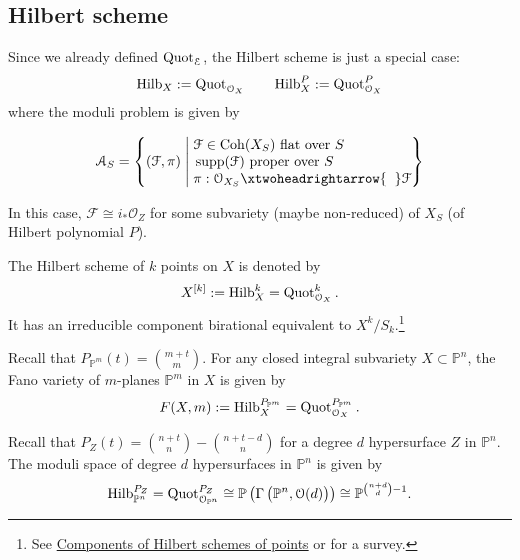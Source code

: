 \subsection{Hilbert scheme}
Since we already defined $\operatorname{Quot}_{\mathcal{E}}$, the Hilbert scheme is just a special case:
$$\operatorname{Hilb}_X:= \operatorname{Quot}_{\mathcal{O}_X} \qquad \operatorname{Hilb}_X^P:= \operatorname{Quot}_{\mathcal{O}_X}^P$$
where the moduli problem is given by

$$\mathcal{A}_S=\left\{(\mathcal{F},\pi)  \;\middle|\; \begin{aligned}
&\\[-5mm]
&\mathcal{F} \in \Coh(X_S) \text{ flat over $S$ }\\[-1mm]
&\supp(\mathcal{F})  \text{ proper over $S$ }\\[-1mm]
& \pi:\mathcal{O}_{X_S} \xtwoheadrightarrow{\hspace{2mm}}  \mathcal{F}
\end{aligned}
 \right\}$$
 
 In this case, $\mathcal{F} \cong i_* \mathcal{O}_Z$ for some subvariety (maybe non-reduced) of $X_S$ (of Hilbert polynomial $P$).
 
\begin{eg}
The Hilbert scheme of $k$ points on $X$ is denoted by $$X^{[k]}:= \operatorname{Hilb}_X^k= \operatorname{Quot}_{\mathcal{O}_X}^k.$$
It has an irreducible component birational equivalent to $X^k/S_k$.\footnote{See \href{https://ravif.web.illinois.edu/exposition/seminar_talks/Components\%20of\%20Hilbert\%20schemes\%20of\%20points.pdf}{Components of Hilbert schemes of points} or \cite[Chapter 18]{MS05} for a survey.}
\end{eg} 

\begin{eg}
Recall that $P_{\mathbb{P}^m}(t) = \binom{m+t}{m}$. For any closed integral subvariety $X \subset \mathbb{P}^n$, the Fano variety of $m$-planes $\mathbb{P}^m$ in $X$ is given by
$$F(X,m):= \operatorname{Hilb}_X^{P_{\mathbb{P}^m}}= \operatorname{Quot}_{\mathcal{O}_X}^{P_{\mathbb{P}^m}}.$$
\end{eg} 
\begin{eg}
Recall that $P_{Z}(t) = \binom{n+t}{n}- \binom{n+t-d}{n}$ for a degree $d$ hypersurface $Z$ in $\mathbb{P}^n$.
The moduli space of degree $d$ hypersurfaces in $\mathbb{P}^n$ is given by
$$\Hilb_{\mathbb{P}^n}^{P_{Z}}= \Quot_{\mathcal{O}_{\mathbb{P}^n}}^{P_{Z}} \cong \mathbb{P}\left(\rule{0mm}{3.2mm} \Gamma \left(\rule{0mm}{3mm} \mathbb{P}^n, \mathcal{O}(d) \right) \right) \cong \mathbb{P}^{\binom{n+d}{d}-1}.$$
\end{eg} 




